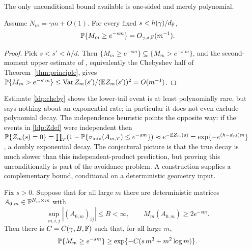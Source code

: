 The only unconditional bound available is one-sided and merely polynomial.

\begin{proposition}\label{ldp:lower-poly}
Assume \(N_m=\gamma m+O(1)\).  For every fixed \(s<h(\gamma)/d_{\mathbb{F}}\),
\begin{equation}\label{ldp:cheby}
  \mathbb{P}\{M_m\ge e^{-sm}\}=O_{\gamma,s,\mathbb{F}}(m^{-1}).
\end{equation}
\end{proposition}

\begin{proof}
Pick \(s<s'<h/d\).  Then \(\{M_m\ge e^{-sm}\}\subseteq\{M_m> e^{-s'm}\}\), and the
second-moment upper estimate of \cite{ShmaloExtremal2026}, equivalently the
Chebyshev half of Theorem~\ref{thm:principle}, gives
\(\mathbb{P}\{M_m> e^{-s'm}\}\le \operatorname{Var} Z_m(s')/(\mathbb{E} Z_m(s'))^2=O(m^{-1})\).
\end{proof}

Estimate \eqref{ldp:cheby} shows the lower-tail event is at least polynomially
rare, but says nothing about an exponential rate; in particular it does not even
exclude polynomial decay.  The independence heuristic points the opposite way: if
the events in \eqref{ldp:Zdef} were independent then
\(\mathbb{P}\{Z_m(s)=0\}=\prod_T(1-\mathbb{P}\{\sigma_{\min}(A_{m,T})\le e^{-sm}\})\approx
e^{-\mathbb{E} Z_m(s)}=\exp\{-e^{(h-d_{\mathbb{F}} s)m}\}\), a doubly exponential decay.  The
conjectural picture is that the true decay is much slower than this
independent-product prediction, but proving this unconditionally is part of the
avoidance problem.  A construction supplies a complementary bound, conditional
on a deterministic geometry input.

\begin{proposition}\label{ldp:lower-construct}
Fix \(s>0\).  Suppose that for all large \(m\) there are deterministic matrices
\(A_{0,m}\in\mathbb{F}^{N_m\times m}\) with
\[
  \sup_{m,i,j}|(A_{0,m})_{ij}|\le B<\infty,
  \qquad
  M_m(A_{0,m})\ge 2e^{-sm}.
\]
Then there is \(C=C(\gamma,B,\mathbb{F})\) such that, for all large \(m\),
\begin{equation}\label{ldp:m3}
  \mathbb{P}\{M_m\ge e^{-sm}\}\ge
  \exp\{-C(s\,m^{3}+m^2\log m)\}.
\end{equation}
\end{proposition}

